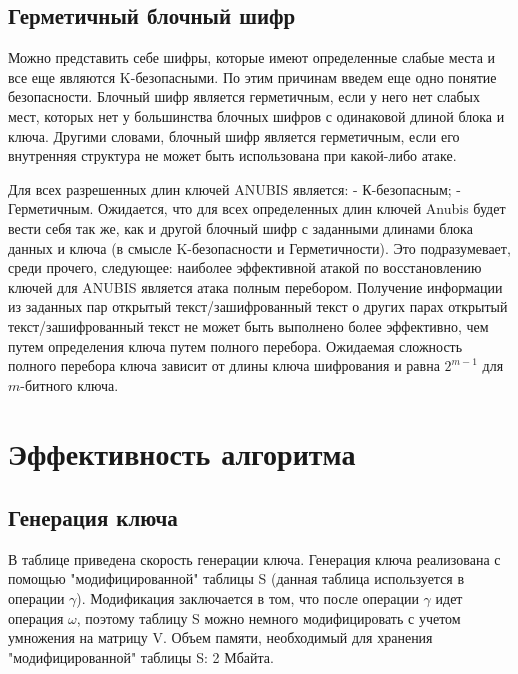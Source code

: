 \documentclass[12pt]{article}
\begin{document}
\subsection{Герметичный блочный шифр}
Можно представить себе шифры, которые имеют определенные слабые места и все еще являются K-безопасными. По этим причинам введем еще одно понятие безопасности.
Блочный шифр является герметичным, если у него нет слабых мест, которых нет у большинства блочных шифров с одинаковой длиной блока и ключа. Другими словами, блочный шифр является герметичным, если его внутренняя структура не может быть использована при какой-либо атаке.

Для всех разрешенных длин ключей ANUBIS является:
\newline
- К-безопасным;
\newline
- Герметичным.
\newline
Ожидается, что для всех определенных длин ключей Anubis будет вести себя так же, как и другой блочный шифр с заданными длинами блока данных и ключа (в смысле K-безопасности и Герметичности). Это подразумевает, среди прочего, следующее: наиболее эффективной атакой по восстановлению ключей для ANUBIS является атака полным перебором. Получение информации из заданных пар открытый текст/зашифрованный текст о других парах открытый текст/зашифрованный текст не может быть выполнено более эффективно, чем путем определения ключа путем полного перебора. Ожидаемая сложность полного перебора ключа зависит от длины ключа шифрования и равна $2^{m-1}$ для $m$-битного ключа. 

\section{Эффективность алгоритма}

\subsection{Генерация ключа}
В таблице приведена скорость генерации ключа. Генерация ключа реализована с помощью "модифицированной" таблицы S (данная таблица используется в операции $\gamma$). Модификация заключается в том, что после операции $\gamma$ идет операция $\omega$, поэтому таблицу S можно немного модифицировать с учетом умножения на матрицу V. Объем памяти, необходимый для хранения "модифицированной" таблицы S: 2 Мбайта.
\end{document}
